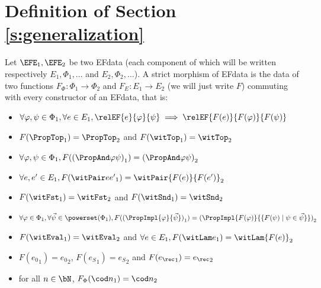 \section{Definition of Section \ref{s:generalization}}
\label{app:generalization}
\begingroup
{}
\begin{definition}
Let $\EFE_1,\EFE_2$ be two EFdata (each component of which will be written respectively $E_1,\Phi_1,\ldots$ and $E_2,\Phi_2,\ldots$).
A strict morphism of EFdata is the data of two functions $F_{\Phi} : \Phi_1 \to \Phi_2$ and $F_E : E_1 \to E_2$ (we will just write $F$) commuting with every constructor of an EFdata, that is:
  \begin{itemize}
  \item $\forall \varphi, \psi \in \Phi_1, \forall e \in E_1, \relEF{e}{\varphi}{\psi} \implies \relEF{F(e)}{F(\varphi)}{F(\psi)}$
  \item $F(\PropTop_1) = \PropTop_2$ and $F({\witTop}_1) = {\witTop}_2$
  \item $\forall \varphi, \psi \in \Phi_1, F({(\PropAnd \varphi \psi)}_1) = {(\PropAnd \varphi \psi)}_2$
  \item $\forall e, e' \in E_1, F({\witPair e {e'}}_1) = \witPair{F(e)}{F(e')}_2$
  \item $F({\witFst}_1) = {\witFst}_2$ and $F({\witSnd}_1) = {\witSnd}_2$
  \item $\forall \varphi \in \Phi_1, \forall \vec \psi \in \powerset(\Phi_1),F({(\PropImpl{\varphi}{\vec\psi})}_1) = {(\PropImpl{F(\varphi)}{\{F(\psi)\mid \psi \in \vec \psi\}})}_2$
  \item $F({\witEval}_1) = {\witEval}_2$ and $\forall e \in E_1, F({\witLam e}_1) = {\witLam{F(e)}}_2$
  \item $F({e_{0}}_1) = {e_{0}}_2$, $F({e_{S}}_1) = {e_S}_2$ and $F({e_{\rec}}_1) = {e_{\rec}}_2$
  \item for all $n \in \bN$, $F_{\Phi}({\cod n}_1) = {\cod n}_2$
  \end{itemize}
\end{definition}
\endgroup
